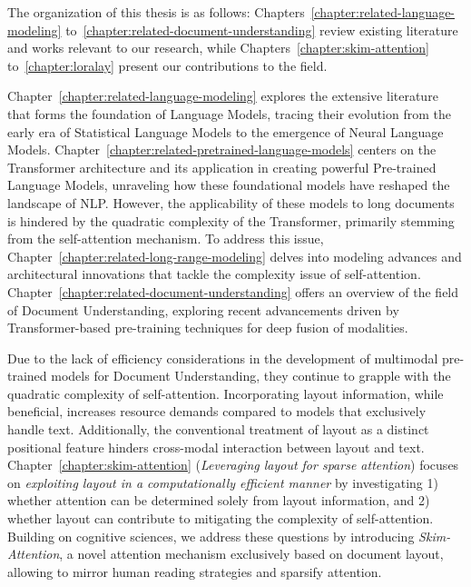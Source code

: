
The organization of this thesis is as follows: Chapters~\ref{chapter:related-language-modeling} to~\ref{chapter:related-document-understanding} review existing literature and works relevant to our research, while Chapters~\ref{chapter:skim-attention} to~\ref{chapter:loralay} present our contributions to the field.

Chapter~\ref{chapter:related-language-modeling} explores the extensive literature that forms the foundation of Language Models, tracing their evolution from the early era of Statistical Language Models to the emergence of Neural Language Models. Chapter~\ref{chapter:related-pretrained-language-models} centers on the Transformer architecture \citep{vaswani2017attention} and its application in creating powerful Pre-trained Language Models, unraveling how these foundational models have reshaped the landscape of \ac{NLP}. However, the applicability of these models to long documents is hindered by the quadratic complexity of the Transformer, primarily stemming from the self-attention mechanism. To address this issue, Chapter~\ref{chapter:related-long-range-modeling} delves into modeling advances and architectural innovations that tackle the complexity issue of self-attention. Chapter~\ref{chapter:related-document-understanding} offers an overview of the field of Document Understanding, exploring recent advancements driven by Transformer-based pre-training techniques for deep fusion of modalities. 

Due to the lack of efficiency considerations in the development of multimodal pre-trained models for Document Understanding, they continue to grapple with the quadratic complexity of self-attention. Incorporating layout information, while beneficial, increases resource demands compared to models that exclusively handle text. Additionally, the conventional treatment of layout as a distinct positional feature hinders cross-modal interaction between layout and text. Chapter~\ref{chapter:skim-attention} (\textit{Leveraging layout for sparse attention}) focuses on \textit{exploiting layout in a computationally efficient manner} by investigating 1) whether attention can be determined solely from layout information, and 2) whether layout can contribute to mitigating the complexity of self-attention. Building on cognitive sciences, we address these questions by introducing \textit{Skim-Attention}, a novel attention mechanism exclusively based on document layout, allowing to mirror human reading strategies and sparsify attention. 

